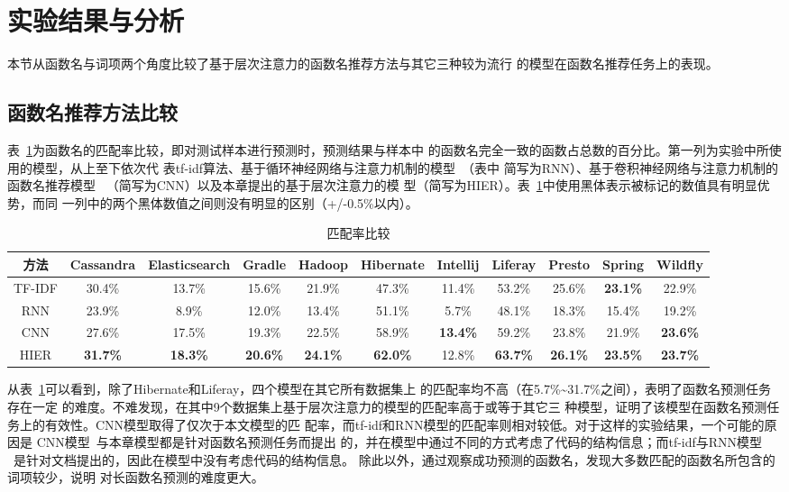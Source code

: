 \section{实验结果与分析}
本节从函数名与词项两个角度比较了基于层次注意力的函数名推荐方法与其它三种较为流行
的模型在函数名推荐任务上的表现。

\subsection{函数名推荐方法比较}
表~\ref{accuracy3}为函数名的匹配率比较，即对测试样本进行预测时，预测结果与样本中
的函数名完全一致的函数占总数的百分比。第一列为实验中所使用的模型，从上至下依次代
表tf-idf算法、基于循环神经网络与注意力机制的模型~\cite{bahdanau2015neural}（表中
简写为RNN）、基于卷积神经网络与注意力机制的函数名推荐模型
~\cite{allamanis2016convolutional}（简写为CNN）以及本章提出的基于层次注意力的模
型（简写为HIER）。表~\ref{accuracy3}中使用黑体表示被标记的数值具有明显优势，而同
一列中的两个黑体数值之间则没有明显的区别（+/-0.5\%以内）。

\begin{table}[!t]
\scriptsize
\renewcommand{\arraystretch}{1.3}
\caption{匹配率比较}
\label{accuracy3}
\centering
\begin{tabular}{ccccccccccc}
\toprule
方法 &Cassandra &Elasticsearch &Gradle &Hadoop &Hibernate &Intellij &Liferay &Presto &Spring &Wildfly\\ 
\midrule
TF-IDF&30.4\%&13.7\% &15.6\% &21.9\%&47.3\% &11.4\% &53.2\% &25.6\% &\bf{23.1\%} &22.9\%\\ 
RNN&23.9\% &8.9\% &12.0\%  &13.4\% &51.1\% &5.7\% &48.1\% &18.3\% &15.4\% &19.2\%\\ 
CNN& 27.6\% &17.5\% &19.3\% & 22.5\% &58.9\% &\bf{13.4\%} &59.2\% &23.8\% &21.9\% &\bf{23.6\%}\\ 
HIER&\bf{31.7\%} &\bf{18.3\%} &\bf{20.6\%} &\bf{24.1\%} &\bf{62.0\%} &12.8\% &\bf{63.7\%} &\bf{26.1\%} &\bf{23.5\%} &\bf{23.7\%}\\
\bottomrule
\end{tabular}
\end{table}

从表~\ref{accuracy3}可以看到，除了Hibernate和Liferay，四个模型在其它所有数据集上
的匹配率均不高（在5.7\%\textasciitilde31.7\%之间），表明了函数名预测任务存在一定
的难度。不难发现，在其中9个数据集上基于层次注意力的模型的匹配率高于或等于其它三
种模型，证明了该模型在函数名预测任务上的有效性。CNN模型取得了仅次于本文模型的匹
配率，而tf-idf和RNN模型的匹配率则相对较低。对于这样的实验结果，一个可能的原因是
CNN模型~\cite{allamanis2016convolutional}与本章模型都是针对函数名预测任务而提出
的，并在模型中通过不同的方式考虑了代码的结构信息；而tf-idf与RNN模型
~\cite{bahdanau2015neural}是针对文档提出的，因此在模型中没有考虑代码的结构信息。
除此以外，通过观察成功预测的函数名，发现大多数匹配的函数名所包含的词项较少，说明
对长函数名预测的难度更大。

